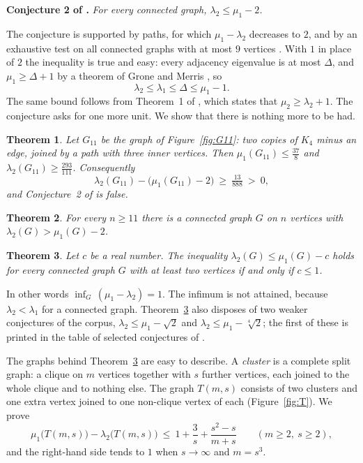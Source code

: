 \documentclass[11pt]{amsart}
\newtheorem{theorem}{Theorem}[section]
\theoremstyle{definition}
\theoremstyle{remark}
\begin{document}
\medskip
\noindent\textbf{Conjecture 2 of \cite{Cazenave}.}
\emph{For every connected graph, $\lambda_2\le\mu_1-2$.}
\medskip

The conjecture is supported by paths, for which $\mu_1-\lambda_2$ decreases to $2$, and by an
exhaustive test on all connected graphs with at most $9$ vertices \cite{Cazenave}. With $1$ in
place of $2$ the inequality is true and easy: every adjacency eigenvalue is at most $\Delta$,
and $\mu_1\ge\Delta+1$ by a theorem of Grone and Merris \cite{GroneMerris}, so
\begin{equation}\label{eq:known}
\lambda_2\le\lambda_1\le\Delta\le\mu_1-1 .
\end{equation}
The same bound follows from Theorem~1 of \cite{Cazenave}, which states that
$\mu_2\ge\lambda_2+1$. The conjecture asks for one more unit. We show that there is nothing more
to be had.

\begin{theorem}\label{thm:G11}
Let $G_{11}$ be the graph of Figure~\ref{fig:G11}: two copies of $K_4$ minus an edge, joined by a
path with three inner vertices. Then $\mu_1(G_{11})\le\frac{37}{8}$ and
$\lambda_2(G_{11})\ge\frac{293}{111}$. Consequently
\[
\lambda_2(G_{11})-\bigl(\mu_1(G_{11})-2\bigr)\ \ge\ \tfrac{13}{888}\ >\ 0 ,
\]
and Conjecture~2 of \cite{Cazenave} is false.
\end{theorem}

\begin{theorem}\label{thm:family}
For every $n\ge 11$ there is a connected graph $G$ on $n$ vertices with
$\lambda_2(G)>\mu_1(G)-2$.
\end{theorem}

\begin{theorem}\label{thm:sharp}
Let $c$ be a real number. The inequality $\lambda_2(G)\le\mu_1(G)-c$ holds for every connected
graph $G$ with at least two vertices if and only if $c\le 1$.
\end{theorem}

In other words $\inf_G\,(\mu_1-\lambda_2)=1$. The infimum is not attained, because
$\lambda_2<\lambda_1$ for a connected graph. Theorem~\ref{thm:sharp} also disposes of two weaker
conjectures of the corpus, $\lambda_2\le\mu_1-\sqrt2$ and $\lambda_2\le\mu_1-\sqrt[4]{2}$; the
first of these is printed in the table of selected conjectures of \cite{DuhamelCazenave}.

The graphs behind Theorem~\ref{thm:sharp} are easy to describe. A \emph{cluster} is a complete
split graph: a clique on $m$ vertices together with $s$ further vertices, each joined to the
whole clique and to nothing else. The graph $T(m,s)$ consists of two clusters and one extra
vertex joined to one non-clique vertex of each (Figure~\ref{fig:T}). We prove
\begin{equation}\label{eq:gapbound}
\mu_1\bigl(T(m,s)\bigr)-\lambda_2\bigl(T(m,s)\bigr)\ \le\ 1+\frac{3}{s}+\frac{s^2-s}{m+s}
\qquad(m\ge2,\ s\ge2),
\end{equation}
and the right-hand side tends to $1$ when $s\to\infty$ and $m=s^3$.
\end{document}
